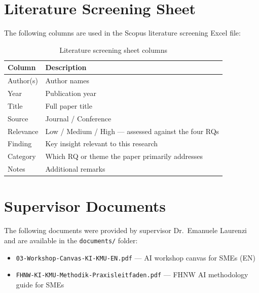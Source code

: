 \chapter{Literature Screening Sheet}
\label{app:screening}

The following columns are used in the Scopus literature screening Excel file:

\begin{table}[htbp]
  \centering
  \caption{Literature screening sheet columns}
  \label{tab:screening_columns}
  \begin{tabular}{@{}lp{9cm}@{}}
    \toprule
    \textbf{Column} & \textbf{Description} \\
    \midrule
    Author(s)   & Author names \\
    Year        & Publication year \\
    Title       & Full paper title \\
    Source      & Journal / Conference \\
    Relevance   & Low / Medium / High — assessed against the four RQs \\
    Finding     & Key insight relevant to this research \\
    Category    & Which RQ or theme the paper primarily addresses \\
    Notes       & Additional remarks \\
    \bottomrule
  \end{tabular}
\end{table}

\chapter{Supervisor Documents}
\label{app:supervisor_docs}

The following documents were provided by supervisor Dr.\ Emanuele Laurenzi and are available
in the \texttt{documents/} folder:

\begin{itemize}
  \item \texttt{03-Workshop-Canvas-KI-KMU-EN.pdf} — AI workshop canvas for SMEs (EN)
  \item \texttt{FHNW-KI-KMU-Methodik-Praxisleitfaden.pdf} — FHNW AI methodology guide for SMEs
\end{itemize}
